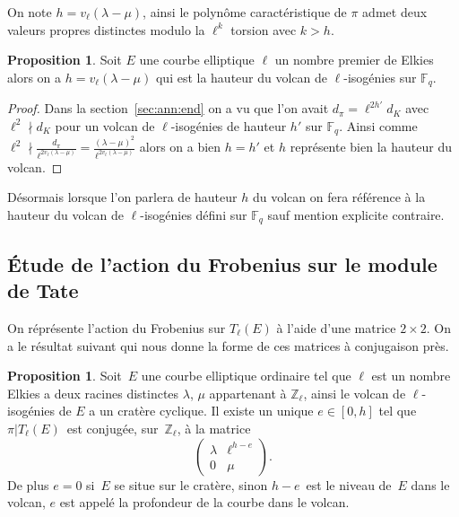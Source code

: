 \documentclass[10pt,a4paper]{book}
\theoremstyle{plain}
\theoremstyle{definition}
\theoremstyle{definition}
\theoremstyle{definition}
\newtheorem{prop}[thm]{Proposition}
\theoremstyle{definition}
\theoremstyle{remark}
\theoremstyle{remark}
\theoremstyle{definition}
\begin{document}
On note $h=v_{\ell}(\lambda - \mu)$, ainsi le polynôme caractéristique de $\pi$ admet deux valeurs propres distinctes modulo la $\ell^k$ torsion avec $k > h$.

\begin{prop}
\label{pro:hau:vol}
Soit $E$ une courbe elliptique $\ell$ un nombre premier de Elkies alors on a 
$h=v_{\ell}(\lambda - \mu)$ qui est la hauteur du volcan de $\ell$-isogénies 
sur $\mathbb{F}_q$.
\end{prop}

\begin{proof}
Dans la section~\ref{sec:ann:end} on a vu que l'on avait $d_{\pi}=\ell^{2h'}d_K$ 
avec $\ell^2 \nmid d_K$ pour un volcan de $\ell$-isogénies de hauteur $h'$ sur 
$\mathbb{F}_q$. Ainsi comme $\ell^{2} \nmid  \frac{d_\pi}{\ell^{2 v_{\ell}
(\lambda - \mu)}}=\frac{(\lambda - \mu)^2}{\ell^{2 v_{\ell}(\lambda - \mu)}}$ 
alors on a bien $h=h'$ et $h$ représente bien la hauteur du volcan. 
\end{proof}
 
Désormais lorsque l'on parlera de hauteur $h$ du volcan on fera référence à la
hauteur du volcan de $\ell$-isogénies défini sur $\mathbb{F}_q$ sauf mention 
explicite contraire.
\subsection{\'Etude de l'action du Frobenius sur le module de Tate}
\label{subs:elk:dir}

On réprésente l'action du Frobenius sur $T_{\ell}(E)$ à l'aide d'une matrice $
2 \times 2$. On a le résultat suivant qui nous donne la forme de ces matrices à
conjugaison près.


\begin{prop}\label{pro:mat:fro}
Soit~$E$ une courbe elliptique ordinaire tel que $\ell$ est un nombre Elkies
a deux racines distinctes $\lambda$, $\mu$ appartenant à $\mathbb{Z}_{\ell}$,
ainsi le volcan de $\ell$-isogénies de $E$ a un cratère cyclique.
Il existe un unique $e \in [ 0, h]$
tel que $\pi|T_{\ell}(E)$~est conjugée, sur~$\mathbb{Z}_{\ell}$,
à la matrice 
\begin{equation*}
\left ( \begin{matrix}\lambda & \ell^{h-e} \\ 0 & \mu
\end{matrix}\right ).
\end{equation*}
De plus $e = 0$ si~$E$ se situe sur le cratère,
sinon $h - e$~est le niveau de~$E$ dans le volcan, $e$ est appelé la profondeur
de la courbe dans le volcan.
\end{prop}
\end{document}
